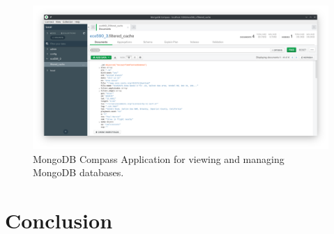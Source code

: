 \documentclass[conference,twoside]{IEEEtran}
\begin{document}
\begin{figure}[tb]  %
  \centering
  \includegraphics[width=\textwidth]{compass_screenshot}
  \caption{MongoDB Compass Application for viewing and managing MongoDB databases.}
  \label{fig:compass}
\end{figure}
\section{Conclusion}



\end{document}
